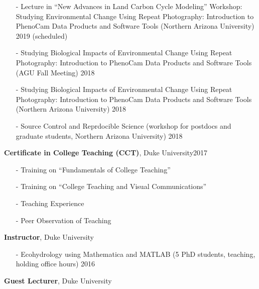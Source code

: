\documentclass[10pt]{article}
\newenvironment{changemargin}[2]{%
  \begin{list}{}{%
    \setlength{\topsep}{0pt}%
    \setlength{\leftmargin}{#1}%
    \setlength{\rightmargin}{#2}%
    \setlength{\listparindent}{\parindent}%
    \setlength{\itemindent}{\parindent}%
    \setlength{\parsep}{\parskip}%
  }%
  \item[]}{\end{list}
}
\newenvironment{body} {
	\vspace*{-2pt}
	\begin{changemargin}{-0.5in}{-0.5in}
  }
	{\end{changemargin}
}
\begin{document}
\begin{body}
\begin{itemize}
		
		 \item[-] Lecture in ``New Advances in Land Carbon Cycle Modeling'' Workshop: Studying Environmental Change Using Repeat Photography: Introduction to PhenoCam Data Products and Software Tools (Northern Arizona University)  \hfill {2019 (scheduled)}


  		\item[-]Studying Biological Impacts of Environmental Change Using Repeat Photography: Introduction to PhenoCam Data Products and Software Tools (AGU Fall Meeting)  \hfill {2018}
  		
  		\item[-]Studying Biological Impacts of Environmental Change Using Repeat Photography: Introduction to PhenoCam Data Products and Software Tools (Northern Arizona University)  \hfill {2018}
  		
  		\item[-]Source Control and Reprdocible Science (workshop for postdocs and graduate students, Northern Arizona University)  \hfill {2018}
  	\end{itemize}
\medskip


	\textbf{Certificate in College Teaching (CCT)}, Duke University\hfill {2017}\\
		\vspace*{-4pt}
		\begin{itemize} \itemsep -0pt
  		\item[-]Training on ``Fundamentals of College Teaching''\\
  		\item[-]Training on ``College Teaching and Visual Communications''\\
      \item[-]Teaching Experience
      \item[-]Peer Observation of Teaching \\
  	\end{itemize}

	\medskip


  \textbf {Instructor}, Duke University\\
	\vspace*{-4pt}
		\begin{itemize} \itemsep -0pt
  		\item[-]Ecohydrology using Mathematica and MATLAB (5 PhD students, teaching, holding office hours)  \hfill {2016}
  	\end{itemize}
\medskip

  \textbf {Guest Lecturer}, Duke University\\
	\vspace*{-4pt}
		\begin{itemize} \itemsep -0pt
		

\end{itemize}
\end{body}
\end{document}
